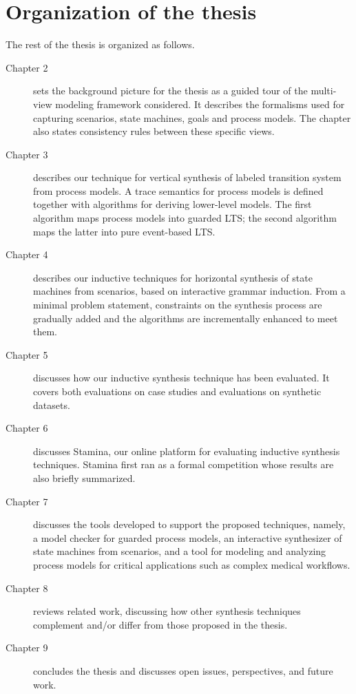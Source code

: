 \section{Organization of the thesis\label{section:intro-organization}}

The rest of the thesis is organized as follows.
\begin{description}

\item[Chapter 2] sets the background picture for the thesis as a guided tour of the multi-view modeling framework considered. It describes the formalisms used for capturing scenarios, state machines, goals and process models. The chapter also states consistency rules between these specific views.

\item[Chapter 3] describes our technique for vertical synthesis of labeled transition system from process models. A trace semantics for process models is defined together with algorithms for deriving lower-level models. The first algorithm maps process models into guarded LTS; the second algorithm maps the latter into pure event-based LTS.

\item[Chapter 4] describes our inductive techniques for horizontal synthesis of state machines from scenarios, based on interactive grammar induction. From a minimal problem statement, constraints on the synthesis process are gradually added and the algorithms are incrementally enhanced to meet them.

\item[Chapter 5] discusses how our inductive synthesis technique has been evaluated. It covers both evaluations on case studies and evaluations on synthetic datasets.

\item[Chapter 6] discusses Stamina, our online platform for evaluating inductive synthesis techniques. Stamina first ran as a formal competition whose results are also briefly summarized.

\item[Chapter 7] discusses the tools developed to support the proposed techniques, namely, a model checker for guarded process models, an interactive synthesizer of state machines from scenarios, and a tool for modeling and analyzing process models for critical applications such as complex medical workflows.

\item[Chapter 8] reviews related work, discussing how other synthesis techniques complement and/or differ from those proposed in the thesis.

\item[Chapter 9] concludes the thesis and discusses open issues, perspectives, and future work. 

\end{description}
